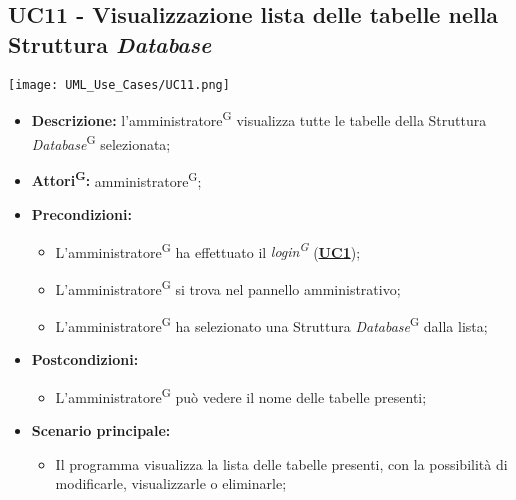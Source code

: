 \subsection{UC11 - Visualizzazione lista delle tabelle nella Struttura \textit{Database}}
\label{sec:UC11}
\texttt{[image: UML\_Use\_Cases/UC11.png]}
\begin{itemize}
	\item \textbf{Descrizione:} l’amministratore\textsuperscript{G} visualizza tutte le tabelle della Struttura \textit{Database}\textsuperscript{G} selezionata;
	\item \textbf{Attori\textsuperscript{G}:} amministratore\textsuperscript{G};
	\item \textbf{Precondizioni:} 
	\begin{itemize}
		\item L’amministratore\textsuperscript{G} ha effettuato il \textit{login\textsuperscript{G}} (\hyperref[sec:UC1]{\textbf{UC1}});
		\item L’amministratore\textsuperscript{G} si trova nel pannello amministrativo;
		\item L'amministratore\textsuperscript{G} ha selezionato una Struttura \textit{Database}\textsuperscript{G} dalla lista;
	\end{itemize}
	\item \textbf{Postcondizioni:} 
	\begin{itemize}
		\item L'amministratore\textsuperscript{G} può vedere il nome delle tabelle presenti;
	\end{itemize}
	\item \textbf{Scenario principale:} 
	\begin{itemize}
		\item Il programma visualizza la lista delle tabelle presenti, con la possibilità di modificarle, visualizzarle o eliminarle;
	\end{itemize}
\end{itemize}

